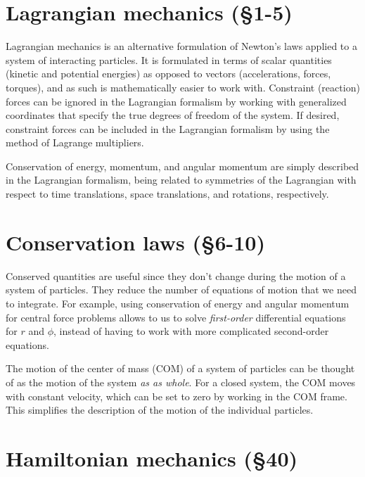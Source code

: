\documentclass[10pt]{article}
\numberwithin{equation}{section}
\begin{document}
\section{Lagrangian mechanics (\S1-5)}

Lagrangian mechanics is an alternative formulation of
Newton's laws applied to a system of interacting particles.
It is formulated in terms of scalar quantities (kinetic
and potential energies) as opposed to vectors
(accelerations, forces, torques), and as such is mathematically
easier to work with.
Constraint (reaction) forces can be ignored in the 
Lagrangian formalism by working with generalized coordinates
that specify the true degrees of freedom of the system.
If desired, constraint forces can be included in the 
Lagrangian formalism by using the method of Lagrange multipliers.

Conservation of energy, momentum, and angular momentum are 
simply described in the Lagrangian formalism, being related 
to symmetries of the Lagrangian with respect to time 
translations, space translations, and rotations, respectively.

\section{Conservation laws (\S6-10)}

Conserved quantities are useful since they don't change
during the motion of a system of particles.
They reduce the number of equations of motion that we
need to integrate.
For example, using conservation of energy and angular
momentum for central force problems allows to us to 
solve {\em first-order} differential equations for $r$ and $\phi$, 
instead of having to work with more complicated 
second-order equations.

The motion of the center of mass (COM) of a system of 
particles can be thought of as the motion of the system 
{\em as as whole}.  
For a closed system, the COM moves with constant velocity, 
which can be set to zero by working in the COM frame.
This simplifies the description of the motion of the 
individual particles.

\section{Hamiltonian mechanics (\S40)}
\end{document}
